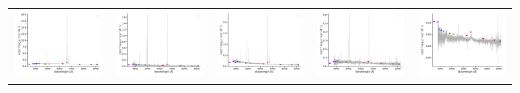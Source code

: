 \begin{center}
\begin{longtable}{l l l l l }
    \includegraphics[width=0.19\linewidth, clip]{Figs/Figs-sdss/spec-1069-52590-0193-STRIPE82-0059-041056.pdf} & \includegraphics[width=0.19\linewidth, clip]{Figs/Figs-sdss/spec-1071-52641-0013-STRIPE82-0057-050992.pdf} & \includegraphics[width=0.19\linewidth, clip]{Figs/Figs-sdss/spec-1071-52641-0266-STRIPE82-0053-009717.pdf} & \includegraphics[width=0.19\linewidth, clip]{Figs/Figs-sdss/spec-1071-52641-0358-STRIPE82-0054-042573.pdf} & \includegraphics[width=0.19\linewidth, clip]{Figs/Figs-sdss/spec-1073-52649-0091-STRIPE82-0049-021805.pdf} \\

\end{longtable}
\end{center}

